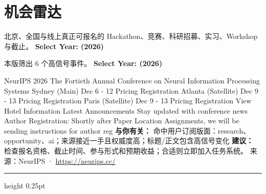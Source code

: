 \documentclass[10.5pt]{ctexart}
\begin{document}
\section*{机会雷达}
{\color{ormuted} 北京、全国与线上真正可报名的 Hackathon、竞赛、科研招募、实习、Workshop 与截止。}
\vspace{2mm}
{\LARGE\bfseries Select Year: (2026)}\par
\vspace{1mm}
{\color{ormuted} 本版筛出 6 个高信号事件。}
\vspace{3mm}
{\Large\bfseries Select Year: (2026)}\par
NeurIPS 2026 The Fortieth Annual Conference on Neural Information Processing Systems Sydney (Main) Dec 6 - 12 Pricing Registration Atlanta (Satellite) Dec 9 - 13 Pricing Registration Paris (Satellite) Dec 9 - 13 Pricing Registration View Hotel Information Latest Announcements Stay updated with conference news Author Registration: Shortly after Paper Location Assignments, we will be sending instructions for author reg
\textbf{与你有关：} 命中用户订阅版面：research、opportunity、ai；来源接近一手且权威度高；标题/正文包含高信号变化
\textbf{建议：} 检查报名资格、截止时间、参与形式和预期收益；合适则立即加入任务系统。
{\footnotesize\color{ormuted} 来源：NeurIPS · \url{https://neurips.cc/}}
\vspace{4mm}
\hrule height 0.25pt
\vspace{3mm}
\end{document}
